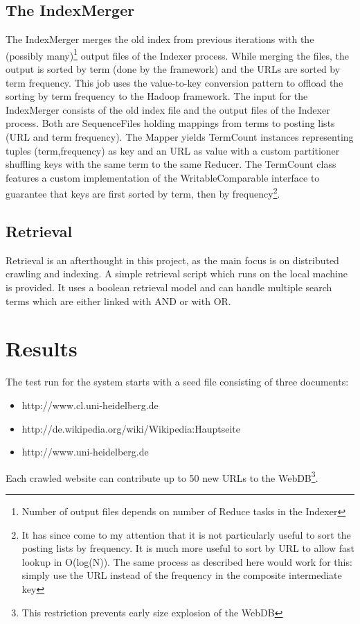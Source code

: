 \documentclass[12pt,a4paper]{report}
\begin{document}
\subsection{The IndexMerger}
The IndexMerger merges the old index from previous iterations with the (possibly many)\footnote{Number of output files depends on number of Reduce tasks in the Indexer} output files of the Indexer process. While merging the files, the output is sorted by term (done by the framework) and the URLs are sorted by term frequency. This job
uses the value-to-key conversion pattern to offload the sorting by term frequency to the Hadoop framework.
The input for the IndexMerger consists of the old index file and the output files of the Indexer process. Both are SequenceFiles holding mappings from terms to posting lists (URL and term frequency). The Mapper yields TermCount instances representing tuples (term,frequency) as key and an URL as value with a custom partitioner shuffling keys with the same term to the same Reducer. The TermCount class features a custom implementation of the WritableComparable interface to guarantee that keys are first sorted by term, then by frequency\footnote{It has since come to my attention that it is not particularly useful to sort the posting lists by frequency. It is much more useful to sort by URL to allow fast lookup in O(log(N)). The same process as described here would work for this: simply use the URL instead of the frequency in the composite intermediate key}.
\subsection{Retrieval}
Retrieval is an afterthought in this project, as the main focus is on distributed crawling and indexing. A simple retrieval script
which runs on the local machine is provided. It uses a boolean retrieval model and can handle multiple search terms
which are either linked with AND or with OR.
\section{Results}
The test run for the system starts with a seed file consisting of three documents:
\begin{itemize}
\item  http://www.cl.uni-heidelberg.de
\item http://de.wikipedia.org/wiki/Wikipedia:Hauptseite
\item http://www.uni-heidelberg.de
\end{itemize}
Each crawled website can contribute up to 50 new URLs to the WebDB\footnote{This restriction prevents early size explosion of the WebDB}.
\end{document}
